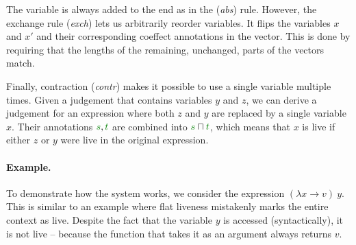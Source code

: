 The variable is always added to the end as in the (\emph{abs}) rule. However, the exchange rule 
(\emph{exch}) lets us arbitrarily reorder variables. It flips the variables $x$ and $x'$ and their
corresponding coeffect annotations in the vector. This is done by requiring that the lengths of the
remaining, unchanged, parts of the vectors match.

Finally, contraction (\emph{contr}) makes it possible to use a single variable multiple times.
Given a judgement that contains variables $y$ and $z$, we can derive a judgement for an expression
where both $z$ and $y$ are replaced by a single variable $x$. Their annotations $\cclrd{s}, \cclrd{t}$
are combined into $\cclrd{s} \sqcap \cclrd{t}$, which means that $x$ is live if either $z$ or $y$
were live in the original expression.

\paragraph{Example.} To demonstrate how the system works, we consider the expression
$(\lambda x \rightarrow v)~y$. This is similar to an example where flat liveness mistakenly marks
the entire context as live. Despite the fact that the variable $y$ is accessed (syntactically), it
is not live -- because the function that takes it as an argument always returns $v$.

